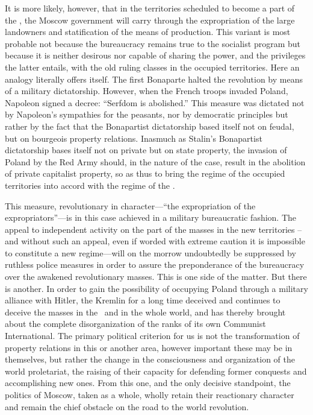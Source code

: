 It is more likely, however, that in the territories scheduled to become a part of the \USSR, the Moscow government will carry through the expropriation of the large landowners and statification of the means of production. This variant is most probable not because the bureaucracy remains true to the socialist program but because it is neither desirous nor capable of sharing the power, and the privileges the latter entails, with the old ruling classes in the occupied territories. Here an analogy literally offers itself. The first Bonaparte halted the revolution by means of a military dictatorship. However, when the French troops invaded Poland, Napoleon signed a decree: “Serfdom is abolished.” This measure was dictated not by Napoleon’s sympathies for the peasants, nor by democratic principles but rather by the fact that the Bonapartist dictatorship based itself not on feudal, but on bourgeois property relations. Inasmuch as Stalin’s Bonapartist dictatorship bases itself not on private but on state property, the invasion of Poland by the Red Army should, in the nature of the case, result in the abolition of private capitalist property, so as thus to bring the regime of the occupied territories into accord with the regime of the \USSR.

This measure, revolutionary in character---``the expropriation of the expropriators''---is in this case achieved in a military bureaucratic fashion. The appeal to independent activity on the part of the masses in the new territories – and without such an appeal, even if worded with extreme caution it is impossible to constitute a new regime---will on the morrow undoubtedly be suppressed by ruthless police measures in order to assure the preponderance of the bureaucracy over the awakened revolutionary masses. This is one side of the matter. But there is another. In order to gain the possibility of occupying Poland through a military alliance with Hitler, the Kremlin for a long time deceived and continues to deceive the masses in the \USSR\ and in the whole world, and has thereby brought about the complete disorganization of the ranks of its own Communist International. The primary political criterion for us is not the transformation of property relations in this or another area, however important these may be in themselves, but rather the change in the consciousness and organization of the world proletariat, the raising of their capacity for defending former conquests and accomplishing new ones. From this one, and the only decisive standpoint, the politics of Moscow, taken as a whole, wholly retain their reactionary character and remain the chief obstacle on the road to the world revolution.

